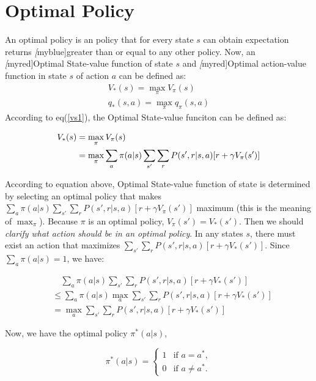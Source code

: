     \section{Optimal Policy}
    An optimal policy is an policy that for every state $s$ can obtain expectation returns \emph[myblue]{greater than or equal to any other policy.} Now, an \emph[myred]{Optimal State-value function} of state $s$ and \emph[myred]{Optimal action-value function} in state $s$ of action $a$ can be defined as: 
    \begin{align*}
        V_*(s)=\max_{\pi}V_{\pi}(s) \\
        q_*(s,a)=\max_{\pi}q_{\pi}(s,a)
    \end{align*}       
    According to eq(\ref{vs1}), the Optimal State-value funciton can be defined as:
    \begin{definition}
        \begin{align}\label{ov1}
            V_*(s) & = \max_{\pi}V_{\pi}(s) \notag \\
                & = \max_{\pi}\sum_{a}\pi(a|s)\sum_{s'}\sum_{r}P(s',r|s,a)[r+\gamma V_{\pi}(s')]
        \end{align}    
    \end{definition}
    
    According to equation above, Optimal State-value function of state is determined by selecting an optimal policy that makes $\sum_{a}\pi(a|s)\sum_{s'}\sum_{r}P(s',r|s,a)[r+\gamma V_{\pi}(s')]$ maximum (this is the meaning of $\max_{\pi}$). Because $\pi$ is an optimal policy,  $V_{\pi}(s')=V_*(s')$. Then we should \emph{clarify what action should be in an optimal policy}. In any states $s$, there must exist an action that maximizes $\sum_{s'}\sum_{r}P(s',r|s,a)[r+\gamma V_*(s')]$. Since $\sum_{a}\pi(a|s)=1$, we have:

    \begin{align*}
        &\quad \sum_{a}\pi (a|s)\sum_{s'}\sum_{r}P(s',r|s,a)[r+\gamma V_*(s')] \\
        & \le \sum_{a}\pi (a|s)\max_{a} \sum_{s'}\sum_{r}P(s',r|s,a)[r+\gamma V_*(s')]\\
        & = \max_{a}\sum_{s'}\sum_{r}P(s',r|s,a)[r+\gamma V_*(s')]
    \end{align*}

    Now, we have the optimal policy $\pi^{*}(a|s)$,
    
    \begin{equation}\label{op1}
        \pi^*(a|s)=\left\{
                         \begin{array}{rl}
                            1 & \text{if } a=a^*, \\
                            0 & \text{if } a\ne a^*.
                         \end{array} \right.
    \end{equation}

